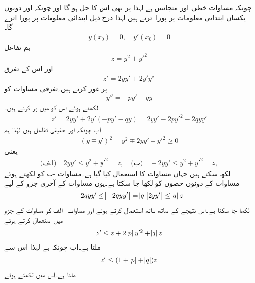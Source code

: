 چونکہ مساوات  خطی اور متجانس ہے  لہٰذا  پر  بھی اس کا حل ہو گا اور چونکہ  اور  دونوں یکساں ابتدائی معلومات پر پورا اترتے ہیں لہٰذا   درج ذیل ابتدائی معلومات پر پورا اترے گا۔
\begin{align}\label{مساوات_ضمیمہ_ضمنی_ابتدائی}
y(x_0)=0, \quad y'(x_0)=0
\end{align}
ہم تفاعل
\begin{align}\label{مساوات_ضمیمہ_ضمنی_تفاعل}
z=y^2+y'^2
\end{align}
اور اس کے تفرق
\begin{align}
z'=2yy'+2y'y''
\end{align}
پر غور کرتے ہیں۔تفرقی مساوات  کو
\begin{align*}
y''=-py'-qy
\end{align*}
لکھتے ہوئے اس کو  میں پر کرتے ہیں۔
\begin{align}\label{مساوات_ضمیمہ_ضمنی_تفاعل_ب}
z'=2yy'+2y'(-py'-qy)=2yy'-2py'^2-2qyy'
\end{align}
اب چونکہ  اور  حقیقی تفاعل ہیں لہٰذا ہم 
\begin{align}
(y \mp y')^2=y^2\mp 2yy'+y'^2 \ge 0
\end{align}
یعنی
\begin{align}\label{مساوات_ضمیمہ_ضمنی_حدود_الف}
\text{(الف)}\quad 2yy' \le y^2+y'^2=z, \quad \text{(ب)}\quad -2yy' \le y^2+y'^2=z,
\end{align}
لکھ سکتے ہیں جہاں مساوات  کا استعمال کیا گیا ہے۔مساوات -ب کو  لکھتے ہوئے مساوات  کے دونوں حصوں کو  لکھا جا سکتا ہے۔یوں مساوات  کے آخری جزو کے لیے
\begin{align*}
-2qyy'\le \abs{-2qyy'}=\abs{q}\abs{2yy'} \le \abs{q}z
\end{align*}
لکھا جا سکتا ہے۔اس نتیجے کے ساتھ ساتھ  استعمال کرتے ہوئے اور  مساوات -الف  کو  مساوات  کے  جزو میں استعمال کرتے ہوئے 
\begin{align*}
z' \le z+2\abs{p}y'^2+\abs{q}z
\end{align*}
ملتا ہے۔اب چونکہ  ہے لہٰذا اس سے
\begin{align*}
z' \le (1+\abs{p}+\abs{q})z
\end{align*}
ملتا ہے۔اس میں  لکھتے ہوئے

